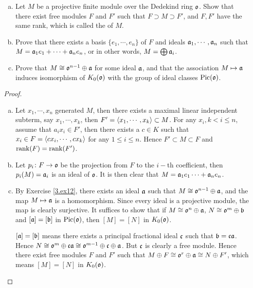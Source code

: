   \begin{ex}
    \begin{enumerate}[a)]
      \item Let $M$ be a projective finite module over the Dedekind ring $\oo$.
               Show that there exist free modules $F$ and $F'$ such that $F\supset M\supset F'$, and $F,F'$ have the same rank, which is called the  of $M$.
      \item Prove that there exists a basis $\{e_1,\cdots,e_n\}$ of $F$ and ideals $\aa_1,\cdots,\aa_n$ such that $M=\aa_1e_1+\cdots+\aa_ne_n$, or in other words, $M=\bigoplus\aa_i$.
      \item Prove that $M\cong\oo^{n-1}\oplus\aa$ for some ideal $\aa$, and that the association $M\mapsto\aa$ induces isomorphism of $K_0(\oo)$ with the group of ideal classes $\Pic(\oo)$.
    \end{enumerate}
  \end{ex}
  \begin{proof}
    \begin{enumerate}[a)]
      \item Let $x_1,\cdots,x_n$ generated $M$, then there exists a maximal linear independent subterm, say $x_1,\cdots,x_k$, then $F'=\<x_1,\cdots,x_k\>\subset M$. For any $x_i, k<i\leqslant n$, assume that $a_ix_i\in F'$, then there exists a $c\in K$ such that $x_i\in F=\<cx_i,\cdots,cx_k\>$ for any $1\leqslant i\leqslant n$. Hence $F'\subset M\subset F$ and $\rank(F)=\rank(F')$.
      \item Let $p_i\colon F\to\oo$ be the projection from $F$ to the $i-$th coefficient, then $p_i(M)=\aa_i$ is an ideal of $\oo$.
               It is then clear that $M=\aa_1e_1\cdots+\aa_ne_n$.
      \item By Exercise \ref{3.ex12}, there exists an ideal $\aa$ such that $M\cong\oo^{n-1}\oplus\aa$, and the map $M\mapsto\aa$ is a homomorphism.
               Since every ideal is a projective module, the map is clearly surjective. It suffices to show that if $M\cong\oo^n\oplus\aa$, $N\cong\oo^m\oplus\bb$ and $[\aa]=[\bb]$ in $\Pic(\oo)$, then $[M]=[N]$ in $K_0(\oo)$.

               $[\aa]=[\bb]$ means there exists a principal fractional ideal $\cc$ such that $\bb=\cc\aa$.
               Hence $N\cong\oo^m\oplus\cc\aa\cong\oo^{m-1}\oplus\cc\oplus\aa$. But $\cc$ is clearly a free module.
               Hence there exist free modules $F$ and $F'$ such that $M\oplus F\cong\oo^r\oplus\aa\cong N\oplus F'$, which means $[M]=[N]$ in $K_0(\oo)$.
    \end{enumerate}
  \end{proof}

